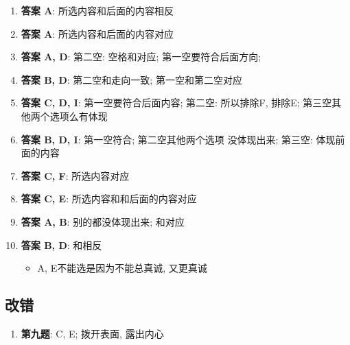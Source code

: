   \begin{enumerate}
    \item \textbf{答案 A}: 所选内容和后面的内容相反
    \item \textbf{答案 A}: 所选内容和后面的内容对应
    \item \textbf{答案 A, D}: 第二空: 空格和对应;
    第一空要符合后面方向;
    \item \textbf{答案 B, D}: 第二空和走向一致; 第一空和第二空对应
    \item \textbf{答案 C, D, I}: 第一空要符合后面内容; 第二空: 
    所以排除F, 排除E; 第三空其他两个选项么有体现
    \item \textbf{答案 B, D, I}: 第一空符合; 第二空其他两个选项
    没体现出来; 第三空: 体现前面的内容
    \item \textbf{答案 C, F}: 所选内容对应
    \item \textbf{答案 C, E}: 所选内容和和后面的内容对应
    \item \textbf{答案 A, B}: 别的都没体现出来; 和对应
    \item \textbf{答案 B, D}: 和相反 
    \begin{itemize}
      \item A, E不能选是因为不能总真诚, 又更真诚
    \end{itemize}
  \end{enumerate}

  \subsection{改错}

    \begin{enumerate}
      \item \textbf{第九题}: C, E; 拨开表面, 露出内心 
    \end{enumerate}
